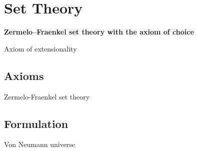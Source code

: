 \chapter{Set Theory}

\begin{axiomset}
    \begin{center}
        \textbf{Zermelo--Fraenkel set theory with the axiom of choice}
    \end{center}
    \begin{axiom}
        Axiom of extensionality
    \end{axiom}
\end{axiomset}

\section{Axioms}
    Zermelo-Fraenkel set theory

\section{Formulation}
    Von Neumann universe

